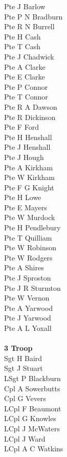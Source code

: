 \begin{multicols}{2}
  Pte J Barlow \\
  Pte P N Bradburn \\
  Pte R N Burrell \\
  Pte H Cash \\
  Pte T Cash \\
  Pte J Chadwick \\
  Pte A Clarke \\
  Pte E Clarke \\
  Pte P Connor \\
  Pte T Connor \\
  Pte R A Dawson \\
  Pte R Dickinson \\
  Pte F Ford \\
  Pte H Henshall \\
  Pte J Henshall \\
  Pte J Hough \\
  Pte A Kirkham \\
  Pte W Kirkham \\
  Pte F G Knight \\
  Pte H Lowe \\
  Pte E Mayers \\
  Pte W Murdock \\
  Pte H Pendlebury \\
  Pte T Quilliam \\
  Pte W Robinson \\
  Pte W Rodgers \\
  Pte A Shires \\
  Pte J Sproston \\
  Pte J R Sturmton \\
  Pte W Vernon \\
  Pte A Yarwood \\
  Pte J Yarwood \\
  Pte A L Yoxall \\
  \\
  \textbf{3 Troop} \\
  Sgt H Baird \\
  Sgt J Stuart \\
  LSgt P Blackburn \\
  Cpl A Sowerbutts \\
  Cpl G Vevers \\
  LCpl F Beaumont \\
  LCpl G Knowles \\
  LCpl J McWaters \\
  LCpl J Ward \\
  LCpl A C Watkins \\

\end{multicols}
